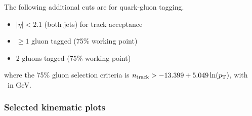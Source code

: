 The following additional cuts are for quark-gluon tagging.
\begin{itemize}
	\item $|\eta| < 2.1$ (both jets) for track acceptance
	\item $\ge 1$ gluon tagged (75\% working point)
	\item 2 gluons tagged (75\% working point)
\end{itemize}
where the 75\% gluon selection criteria is $n_\mathrm{track} > -13.399 +5.049\ln(p_{\mathrm{T}})$, with \pt\ in GeV.


\FloatBarrier

%
\subsubsection{Selected kinematic plots}

